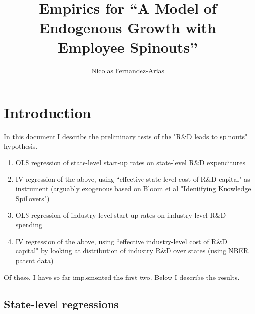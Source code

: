 \documentclass[12pt,english]{article}
\theoremstyle{remark}
\begin{document}
	
\title{Empirics for ``A Model of Endogenous Growth with Employee Spinouts''}
\author{Nicolas Fernandez-Arias}
\maketitle

\section{Introduction}

In this document I describe the preliminary tests of the "R\&D leads to spinouts" hypothesis. 

\begin{enumerate}
	\item OLS regression of state-level start-up rates on state-level R\&D expenditures
	\item IV regression of the above, using ``effective state-level cost of R\&D capital" as instrument (arguably exogenous based on Bloom et al "Identifying Knowledge Spillovers")
	\item OLS regression of industry-level start-up rates on industry-level R\&D spending
	\item IV regression of the above, using ``effective industry-level cost of R\&D capital" by looking at distribution of industry R\&D over states (using NBER patent data)
\end{enumerate}

Of these, I have so far implemented the first two. Below I describe the results.

\subsection{State-level regressions}
\end{document}
